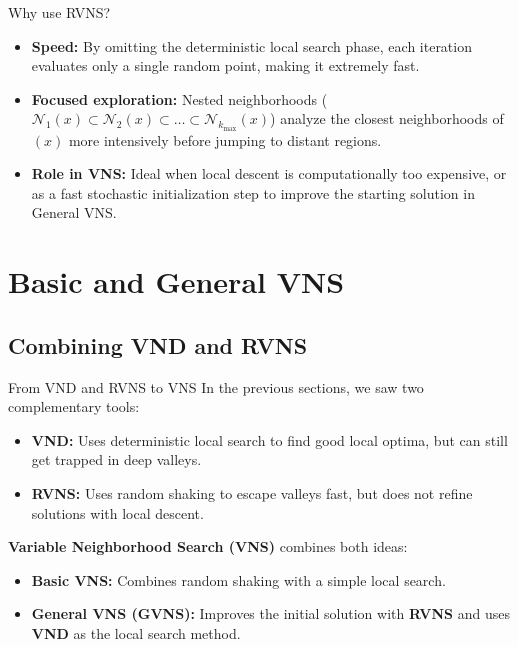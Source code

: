 \documentclass{beamer}
\begin{document}
\begin{frame}{Why use RVNS?}
    \begin{itemize}
        \item \textbf{Speed:} By omitting the deterministic local search phase, each iteration evaluates only a single random point, making it extremely fast.
        \vspace{0.3cm}
        \item \textbf{Focused exploration:} Nested neighborhoods ($\mathcal{N}_1(x) \subset \mathcal{N}_2(x) \subset \dots \subset \mathcal{N}_{k_{\max}}(x)$) analyze the closest neighborhoods of $(x)$ more intensively before jumping to distant regions.
        \vspace{0.3cm}
        \item \textbf{Role in VNS:} Ideal when local descent is computationally too expensive, or as a fast stochastic initialization step to improve the starting solution in General VNS.
    \end{itemize}
\end{frame}




\section{Basic and General VNS}

\subsection{Combining VND and RVNS}
\begin{frame}{From VND and RVNS to VNS}
\quad In the previous sections, we saw two complementary tools:
\begin{itemize}
\item \textbf{VND:} Uses deterministic local search to find good local optima, but can still get trapped in deep valleys.
\item \textbf{RVNS:} Uses random shaking to escape valleys fast, but does not refine solutions with local descent.
\end{itemize}

\vspace{0.3cm}
\quad \textbf{Variable Neighborhood Search (VNS)} combines both ideas:
\begin{itemize}
\item \textbf{Basic VNS:} Combines random shaking with a simple local search.
\item \textbf{General VNS (GVNS):} Improves the initial solution with \textbf{RVNS} and uses \textbf{VND} as the local search method.
\end{itemize}
\end{frame}
\end{document}
